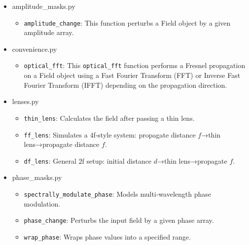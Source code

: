 \documentclass[a4paper,12pt]{report}
\begin{document}
\begin{itemize}[itemsep=1em]  %
  \item[\large\bfseries 1.\ ] amplitude\_masks.py
    \begin{itemize}[itemsep=0.5em]  %
      \item \texttt{amplitude\_change}: This function perturbs a Field object by a given amplitude array.
    \end{itemize}

  \item[\large\bfseries 2.\ ] convenience.py
    \begin{itemize}[itemsep=0.5em]
      \item \texttt{optical\_fft}: This \texttt{optical\_fft} function performs a Fresnel propagation on a Field object using a Fast Fourier Transform (FFT) or Inverse Fast Fourier Transform (IFFT) depending on the propagation direction.
    \end{itemize}

  \item[\large\bfseries 3.\ ] lenses.py
    \begin{itemize}[itemsep=0.5em]
      \item \texttt{thin\_lens}: Calculates the field after passing a thin lens.
      \item \texttt{ff\_lens}: Simulates a 4f‐style system: propagate distance \(f\)→thin lens→propagate distance \(f\).
      \item \texttt{df\_lens}: General 2f setup: initial distance \(d\)→thin lens→propagate \(f\).
    \end{itemize}

  \item[\large\bfseries 4.\ ] phase\_masks.py
    \begin{itemize}[itemsep=0.5em]
      \item \texttt{spectrally\_modulate\_phase}: Models multi‐wavelength phase modulation.
      \item \texttt{phase\_change}: Perturbs the input field by a given phase array.
      \item \texttt{wrap\_phase}: Wraps phase values into a specified range.
    \end{itemize}


\end{itemize}
\end{document}
